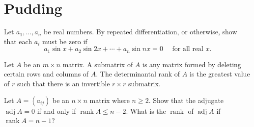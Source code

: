 \documentclass[answers]{exam}
\begin{document}
\section*{Pudding}
\begin{questions}

\question%
Let $a_{1}, \ldots, a_{n}$ be real numbers. By repeated differentiation, or otherwise, show that each $a_{i}$ must be zero if \[
	a_{1} \sin x+a_{2} \sin 2 x+\cdots+a_{n} \sin n x=0 \quad \text { for all real } x.
\]



\question%
Let $A$ be an $m \times n$ matrix. A submatrix of $A$ is any matrix formed by deleting certain rows and columns of $A$. The determinantal rank of $A$ is the greatest value of $r$ such that there is an invertible $r \times r$ submatrix.



\question%
Let $A=\left(a_{i j}\right)$ be an $n \times n$ matrix where $n \geqslant 2$. Show that the adjugate $\operatorname{adj} A=0$ if and only if $\operatorname{rank} A \leqslant n-2$. What is the $\operatorname{rank}$ of $\operatorname{adj} A$ if $\operatorname{rank} A=n-1$?

\end{questions}
\end{document}
